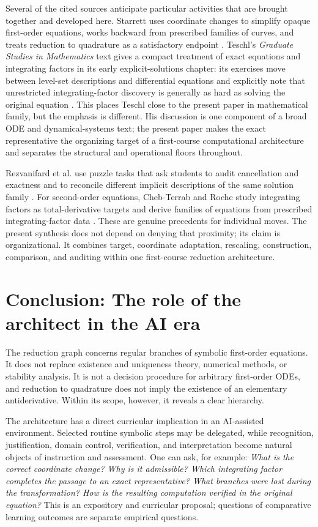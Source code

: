 \documentclass[11pt]{article}
\theoremstyle{definition}
\begin{document}
Several of the cited sources anticipate particular activities that are brought together and developed here. Starrett uses coordinate changes to simplify opaque first-order equations, works backward from prescribed families of curves, and treats reduction to quadrature as a satisfactory endpoint \cite{Starrett2007}. Teschl's \emph{Graduate Studies in Mathematics} text gives a compact treatment of exact equations and integrating factors in its early explicit-solutions chapter: its exercises move between level-set descriptions and differential equations and explicitly note that unrestricted integrating-factor discovery is generally as hard as solving the original equation \cite{Teschl2012}. This places Teschl close to the present paper in mathematical family, but the emphasis is different. His discussion is one component of a broad ODE and dynamical-systems text; the present paper makes the exact representative the organizing target of a first-course computational architecture and separates the structural and operational floors throughout.

Rezvanifard et al. use puzzle tasks that ask students to audit cancellation and exactness and to reconcile different implicit descriptions of the same solution family \cite{Rezvanifard2023}. For second-order equations, Cheb-Terrab and Roche study integrating factors as total-derivative targets and derive families of equations from prescribed integrating-factor data \cite{ChebTerrab1999}. These are genuine precedents for individual moves. The present synthesis does not depend on denying that proximity; its claim is organizational. It combines target, coordinate adaptation, rescaling, construction, comparison, and auditing within one first-course reduction architecture.

\section{Conclusion: The role of the architect in the AI era}

The reduction graph concerns regular branches of symbolic first-order equations. It does not replace existence and uniqueness theory, numerical methods, or stability analysis. It is not a decision procedure for arbitrary first-order ODEs, and reduction to quadrature does not imply the existence of an elementary antiderivative. Within its scope, however, it reveals a clear hierarchy.

The architecture has a direct curricular implication in an AI-assisted environment. Selected routine symbolic steps may be delegated, while recognition, justification, domain control, verification, and interpretation become natural objects of instruction and assessment. One can ask, for example: \emph{What is the correct coordinate change? Why is it admissible? Which integrating factor completes the passage to an exact representative? What branches were lost during the transformation? How is the resulting computation verified in the original equation?} This is an expository and curricular proposal; questions of comparative learning outcomes are separate empirical questions.
\end{document}
